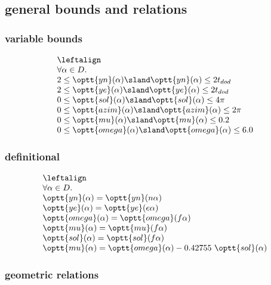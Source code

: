 
\subsection{general bounds and relations}\label{sec:lpbounds}


\subsubsection{variable bounds}

$$
\begin{array}{lll}
\leftalign\\
   \forall \alpha\in D.\\
    2 \le \optt{yn}(\alpha) \sland
    \optt{yn}(\alpha) \le 2t_{dod} \\
    2 \le \optt{ye}(\alpha) \sland
    \optt{ye}(\alpha) \le 2t_{dod}\\
   0 \le \optt{sol}(\alpha) \sland
     \optt{sol}(\alpha) \le 4 \pi \\
   0 \le \optt{azim}(\alpha) \sland
     \optt{azim}(\alpha) \le 2\pi \\
   0 \le \optt{mu}(\alpha) \sland
      \optt{mu}(\alpha) \le 0.2 \\
   0 \le \optt{omega}(\alpha) \sland
      \optt{omega}(\alpha) \le 6.0 \\   
\end{array}
$$

\subsubsection{definitional}
$$
\begin{array}{lll}
\leftalign\\
   \forall \alpha\in D.\\
  \optt{yn}(\alpha) = \optt{yn}(n\alpha) \\
  \optt{ye}(\alpha) = \optt{ye}(e\alpha) \\
  \optt{omega}(\alpha) = \optt{omega}(f\alpha) \\
  \optt{mu}(\alpha) = \optt{mu}(f\alpha) \\
  \optt{sol}(\alpha)= \optt{sol}(f\alpha) \\
  \optt{mu}(\alpha) = \optt{omega}(\alpha) - 0.42755\ \optt{sol}(\alpha) \\
\end{array}
$$

\subsubsection{geometric relations}

